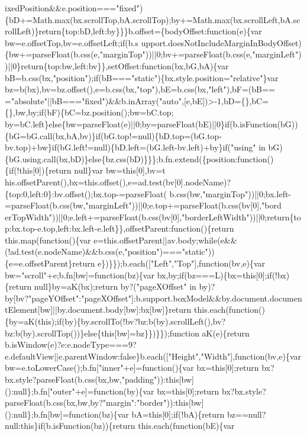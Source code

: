 \begin{DoxyCode}
{      ixedPosition&&e.position==="fixed")\{bD+=Math.max(bx.scrollTop,bA.scrollTop);by+=Math.max(bx.scrollLeft,bA.scrollLeft)\}return\{top:bD,left:by\}\}\}b.offset=\{bodyOffset:function(e)\{var
       bw=e.offsetTop,bv=e.offsetLeft;if(b.s
      upport.doesNotIncludeMarginInBodyOffset)\{bw+=parseFloat(b.css(e,"marginTop"))||0;bv+=parseFloat(b.css(e,"marginLeft"))||0\}return\{top:bw,left:bv\}\},setOffset:function(bx,bG,bA)\{var
       bB=b.css(bx,"position");if(bB==="static")\{bx.style.position="relative"\}var
       bz=b(bx),bv=bz.offset(),e=b.css(bx,"top"),bE=b.css(bx,"left"),bF=(bB==
      ="absolute"||bB==="fixed")&&b.inArray("auto",[e,bE])>-1,bD=\{\},bC=\{\},bw,by;if(bF)\{bC=bz.position();bw=bC.top;
      by=bC.left\}else\{bw=parseFloat(e)||0;by=parseFloat(bE)||0\}if(b.isFunction(bG))\{bG=bG.call(bx,bA,bv)\}if(bG.top!=null)\{bD.top=(bG.top-bv.top)+bw\}if(bG.left!=null)\{bD.left=(bG.left-bv.left)+by\}if("using" in
       bG)\{bG.using.call(bx,bD)\}else\{bz.css(bD)\}\}\};b.fn.extend(\{position:function()\{if(!this[0])\{return null\}var
       bw=this[0],bv=t
      his.offsetParent(),bx=this.offset(),e=ad.test(bv[0].nodeName)?\{top:0,left:0\}:bv.offset();bx.top-=parseFloat(
      b.css(bw,"marginTop"))||0;bx.left-=parseFloat(b.css(bw,"marginLeft"))||0;e.top+=parseFloat(b.css(bv[0],"bord
      erTopWidth"))||0;e.left+=parseFloat(b.css(bv[0],"borderLeftWidth"))||0;return\{top:bx.top-e.top,left:bx.left-e.left\}\},offsetParent:function()\{return this.map(function()\{var
       e=this.offsetParent||av.body;while(e&&(!ad.test(e.nodeName)&&b.css(e,"position")==="static"))\{e=e.offsetParent\}return
       e\})\}\});b.each(["Left","Top"],function(bv,e)\{var bw="scroll"+e;b.fn[bw]=function(bz)\{var bx,by;if(bz===L)\{bx=this[0];if(!bx)\{return
       null\}by=aK(bx);return by?("pageXOffset" in
       by)?by[bv?"pageYOffset":"pageXOffset"]:b.support.boxModel&&by.document.documentElement[bw]||by.document.body[bw]:bx[bw]\}return
       this.each(function()\{by=aK(this);if(by)\{by.scrollTo(!bv?bz:b(by).scrollLeft(),bv?bz:b(by).scrollTop())\}else\{this[bw]=bz\}\})\}\});function aK(e)\{return
       b.isWindow(e)?e:e.nodeType===9?e.defaultView||e.parentWindow:false\}b.each(["Height","Width"],function(bv,e)\{var
       bw=e.toLowerCase();b.fn["inner"+e]=function()\{var bx=this[0];return
       bx?bx.style?parseFloat(b.css(bx,bw,"padding")):this[bw]():null\};b.fn["outer"+e]=function(by)\{var bx=this[0];return
       bx?bx.style?parseFloat(b.css(bx,bw,by?"margin":"border")):this[bw]():null\};b.fn[bw]=function(bz)\{var bA=this[0];if(!bA)\{return
       bz==null?null:this\}if(b.isFunction(bz))\{return this.each(function(bE)\{var
}
\end{DoxyCode}
